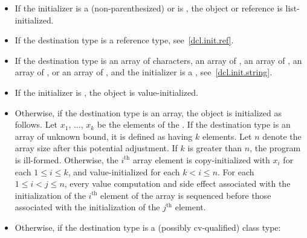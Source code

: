 \begin{itemize}
\item
If the initializer is a (non-parenthesized) 
or is \tcode{=} , the object or reference
is list-initialized.
\item
If the destination type is a reference type, see~\ref{dcl.init.ref}.
\item
If the destination type is an array of characters,
an array of ,
an array of ,
an array of ,
or an array of
,
and the initializer is a , see~\ref{dcl.init.string}.
\item If the initializer is \tcode{()}, the object is value-initialized.
\item
Otherwise, if the destination type is an array,
the object is initialized as follows.
Let $x_1$, $\dotsc$, $x_k$ be
the elements of the .
If the destination type is an array of unknown bound,
it is defined as having $k$ elements.
Let $n$ denote the array size after this potential adjustment.
If $k$ is greater than $n$,
the program is ill-formed.
Otherwise, the $i^\text{th}$ array element is copy-initialized with
$x_i$ for each $1 \leq i \leq k$, and
value-initialized for each $k < i \leq n$.
For each $1 \leq i < j \leq n$,
every value computation and side effect associated with
the initialization of the $i^\text{th}$ element of the array
is sequenced before those associated with
the initialization of the $j^\text{th}$ element.
\item
Otherwise, if the destination type is a (possibly cv-qualified) class type:


\end{itemize}
